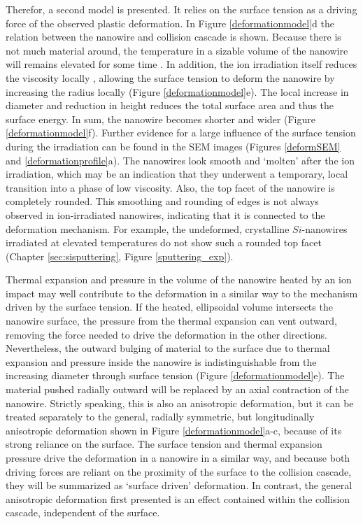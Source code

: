 Therefor, a second model is presented. It relies on the surface tension as a driving force of the observed plastic deformation. In Figure \ref{deformationmodel}d the relation between the nanowire and collision cascade is shown. Because there is not much material around, the temperature in a sizable volume of the nanowire will remains elevated for some time \cite{borschel_ion-solid_2012,greaves_enhanced_2013,anders_sputtering_2015,johannes_ion_2015}. In addition, the ion irradiation itself reduces the viscosity locally \cite{snoeks_stress_1997,hu_burrowing_2002,mayr_mechanisms_2003}, allowing the surface tension to deform the nanowire by increasing the radius locally (Figure \ref{deformationmodel}e). The local increase in diameter and reduction in height reduces the total surface area and thus the surface energy. In sum, the nanowire becomes shorter and wider (Figure \ref{deformationmodel}f). Further evidence for a large influence of the surface tension during the irradiation can be found in the SEM images (Figures \ref{deformSEM} and \ref{deformationprofile}a). The nanowires look smooth and `molten' after the ion irradiation, which may be an indication that they underwent a temporary, local transition into a phase of low viscosity. Also, the top facet of the nanowire is completely rounded. This smoothing and rounding of edges is not always observed in ion-irradiated nanowires, indicating that it is connected to the deformation mechanism. For example, the undeformed, crystalline $Si$-nanowires irradiated at elevated temperatures do not show such a rounded top facet (Chapter \ref{sec:sisputtering}, Figure \ref{sputtering_exp}).

Thermal expansion and pressure in the volume of the nanowire heated by an ion impact may well contribute to the deformation in a similar way to the mechanism driven by the surface tension. If the heated, ellipsoidal volume intersects the nanowire surface, the pressure from the thermal expansion can vent outward, removing the force needed to drive the deformation in the other directions. Nevertheless, the outward bulging of material to the surface due to thermal expansion and pressure inside the nanowire is indistinguishable from the increasing diameter through surface tension (Figure \ref{deformationmodel}e). The material pushed radially outward will be replaced by an axial contraction of the nanowire. Strictly speaking, this is also an anisotropic deformation, but it can be treated separately to the general, radially symmetric, but longitudinally anisotropic deformation shown in Figure \ref{deformationmodel}a-c, because of its strong reliance on the surface. The surface tension and thermal expansion pressure drive the deformation in a nanowire in a similar way, and because both driving forces are reliant on the proximity of the surface to the collision cascade, they will be summarized as `surface driven' deformation. In contrast, the general anisotropic deformation first presented is an effect contained within the collision cascade, independent of the surface. 

